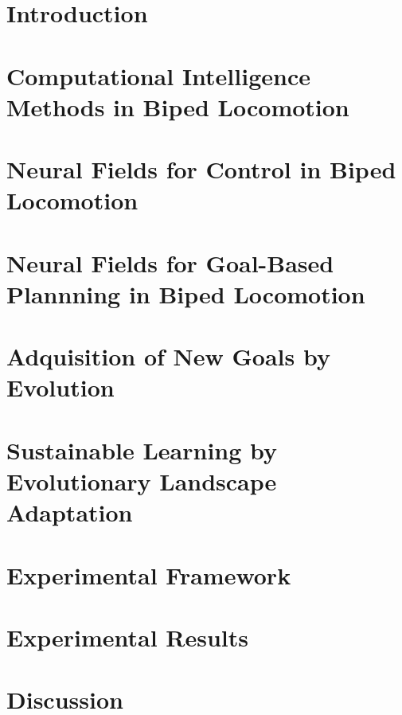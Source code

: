 \section{Introduction} 


\section{Computational Intelligence Methods in Biped Locomotion}


\section{Neural Fields for Control in Biped Locomotion}


\section{Neural Fields for Goal-Based Plannning in Biped Locomotion}


\section{Adquisition of New Goals by Evolution}


\section{Sustainable Learning by Evolutionary Landscape Adaptation}


\section{Experimental Framework}


\section{Experimental Results}


\section{Discussion}
